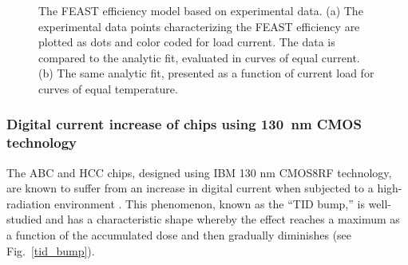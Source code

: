 \begin{figure}[ht]
\centering
{}\quad\quad
{}
\caption{The FEAST efficiency model based on experimental data. (a) The experimental data points
characterizing the FEAST efficiency are plotted as dots and color coded for load current. The data is
compared to the analytic fit, evaluated in curves of equal current. (b) The same analytic fit,
presented as a function of current load for curves of equal temperature.
}
\label{fig:feast_eff}
\end{figure}


\subsubsection{Digital current increase of chips using 130~nm CMOS technology}
\label{sec:tid_explanation}

The ABC and HCC chips, designed using IBM 130 nm CMOS8RF technology, are known to suffer from an
increase in digital current when subjected to a high-radiation environment
\cite{Collaboration:2017mtb}. This phenomenon, known as the ``TID bump,'' is well-studied
\cite{1589217,FACCIO20081000} and has a characteristic shape whereby the effect reaches a maximum
as a function of the accumulated dose and then gradually diminishes (see Fig.~\ref{tid_bump}).

